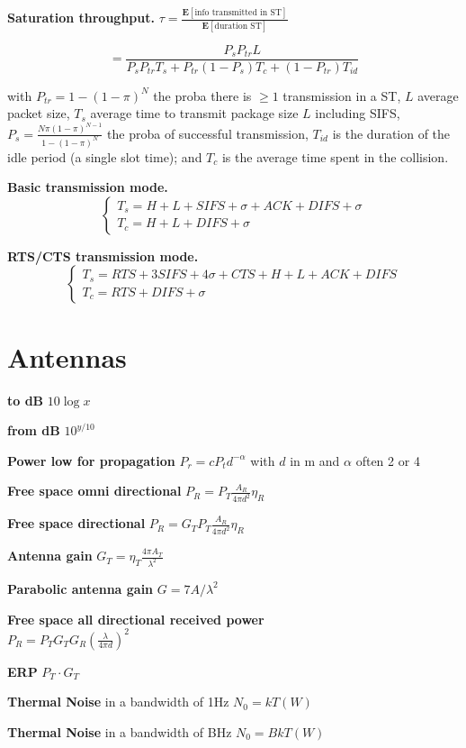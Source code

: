 \documentclass[10pt,twocolumn]{article}
\newcommand{\E}[1]{\mathbf{E}\l[#1\r]}
\renewcommand{\l}{\left}
\renewcommand{\r}{\right}
\newcommand{\pfrac}[2]{\l(\frac{#1}{#2}\r)}
\renewcommand{\bf}{\textbf}
\begin{document}
\bf{Saturation throughput.}
$
  \tau = \frac{\E{\text{info transmitted in ST}}}{\E{\text{duration ST}}}$

\[= \frac {P_s P_{tr} L} {P_s P_{tr}T_s + P_{tr}(1-P_s)T_c + (1-P_{tr})T_{id}}\]

with $P_{tr} = 1 - (1-\pi)^N$ the proba there is $\geq 1$ transmission in a ST, $L$ average packet size, $T_s$ average time to transmit package size $L$ including SIFS, $P_s = \frac{N\pi(1-\pi)^{N-1}}{1-(1-\pi)^N}$ the proba of successful transmission, $T_{id}$ is the duration of the idle period (a single slot time); and $T_c$ is the average time spent in the collision.

\bf{Basic transmission mode.}
\[
  \begin{cases}
    T_s = H+L+SIFS+\sigma+ACK+DIFS+\sigma\\
    T_c = H + L + DIFS + \sigma
  \end{cases}
\]

\bf{RTS/CTS transmission mode.}
\[
  \begin{cases}
    T_s = RTS+3SIFS+4\sigma+CTS+H+L+ACK+DIFS\\
    T_c = RTS + DIFS + \sigma
  \end{cases}
\]

\section{Antennas}

\bf{to dB} $10 \log x$

\bf{from dB} $10^{y/10}$

\textbf{Power low for propagation} $P_r = c P_t d^{-\alpha}$ with $d$ in m and $\alpha$ often 2 or 4

\textbf{Free space omni directional} $P_R = P_T \frac{A_R}{4\pi d^2}\eta_R$

\textbf{Free space directional} $P_R = G_T P_T \frac{A_R}{4\pi d^2}\eta_R$

\textbf{Antenna gain} $G_T =\eta_T \frac{4\pi A_T}{\lambda^2}$

\textbf{Parabolic antenna gain} $G=7A/\lambda^2$

\textbf{Free space all directional received power} \\$P_R = P_T G_T G_R \pfrac{\lambda}{4\pi d}^2$


\textbf{ERP} $P_T \cdot G_T$

\bf{Thermal Noise} in a bandwidth of 1Hz $N_0 = kT (W)$

\bf{Thermal Noise} in a bandwidth of BHz $N_0 = BkT (W)$
\end{document}
